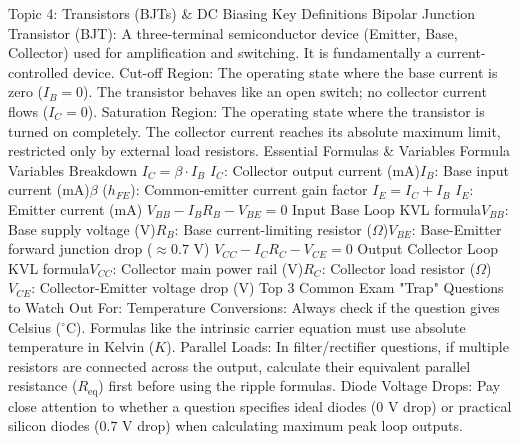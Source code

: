  Topic 4: Transistors (BJTs) & DC Biasing
 Key Definitions
Bipolar Junction Transistor (BJT): A three-terminal semiconductor device (Emitter, Base, Collector) used for amplification and switching. It is fundamentally a current-controlled device.
Cut-off Region: The operating state where the base current is zero ($I_B = 0$). The transistor behaves like an open switch; no collector current flows ($I_C = 0$).
Saturation Region: The operating state where the transistor is turned on completely. The collector current reaches its absolute maximum limit, restricted only by external load resistors.
 Essential Formulas & Variables
Formula Variables Breakdown
$I_C = \beta \cdot I_B$ $I_C$: Collector output current ($\text{mA}$)$I_B$: Base input current ($\text{mA}$)$\beta$ ($h_{FE}$): Common-emitter current gain factor
$I_E = I_C + I_B$ $I_E$: Emitter current ($\text{mA}$)
$V_{BB} - I_B R_B - V_{BE} = 0$ Input Base Loop KVL formula$V_{BB}$: Base supply voltage ($\text{V}$)$R_B$: Base current-limiting resistor ($\Omega$)$V_{BE}$: Base-Emitter forward junction drop ($\approx 0.7\text{ V}$)
$V_{CC} - I_C R_C - V_{CE} = 0$ Output Collector Loop KVL formula$V_{CC}$: Collector main power rail ($\text{V}$)$R_C$: Collector load resistor ($\Omega$)$V_{CE}$: Collector-Emitter voltage drop ($\text{V}$)
 Top 3 Common Exam "Trap" Questions to Watch Out For:
Temperature Conversions: Always check if the question gives Celsius ($^\circ\text{C}$). Formulas like the intrinsic carrier equation must use absolute temperature in Kelvin ($K$).
Parallel Loads: In filter/rectifier questions, if multiple resistors are connected across the output, calculate their equivalent parallel resistance ($R_{\text{eq}}$) first before using the ripple formulas.
Diode Voltage Drops: Pay close attention to whether a question specifies ideal diodes ($0\text{ V}$ drop) or practical silicon diodes ($0.7\text{ V}$ drop) when calculating maximum peak loop outputs.
